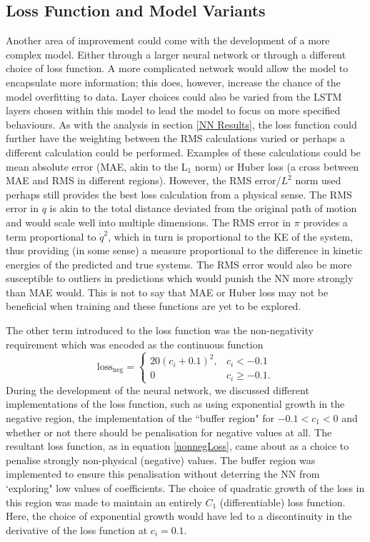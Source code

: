 \documentclass[10pt]{iopart}
\begin{document}
\subsection{Loss Function and Model Variants}
Another area of improvement could come with the development of a more complex model. Either through a larger neural network or through a different choice of loss function. A more complicated network would allow the model to encapsulate more information; this does, however, increase the chance of the model overfitting to data. Layer choices could also be varied from the LSTM layers chosen within this model to lead the model to focus on more specified behaviours. As with the analysis in section \ref{NN Results}, the loss function could further have the weighting between the RMS calculations varied or perhaps a different calculation could be performed. Examples of these calculations could be mean absolute error (MAE, akin to the L$_1$ norm) or Huber loss (a cross between MAE and RMS in different regions). However, the RMS error/$L^2$ norm used perhaps still provides the best loss calculation from a physical sense. The RMS error in $q$ is akin to the total distance deviated from the original path of motion and would scale well into multiple dimensions. The RMS error in $\pi$ provides a term proportional to $\dot q^2$, which in turn is proportional to the KE of the system, thus providing (in some sense) a measure proportional to the difference in kinetic energies of the predicted and true systems. The RMS error would also be more susceptible to outliers in predictions which would punish the NN more strongly than MAE would. This is not to say that MAE or Huber loss may not be beneficial when training and these functions are yet to be explored.

The other term introduced to the loss function was the non-negativity requirement which was encoded as the continuous function 
\begin{equation}
	\label{nonnegLoss}
	\textrm{loss}_{\textrm{neg}} = 
	\begin{cases}
		20(c_i + 0.1)^2, &c_i<-0.1\\
		0 &c_i \geq -0.1.
	\end{cases}
\end{equation}
During the development of the neural network, we discussed different implementations of the loss function, such as using exponential growth in the negative region, the implementation of the ``buffer region" for $-0.1 < c_1 < 0$ and whether or not there should be penalisation for negative values at all. The resultant loss function, as in equation \ref{nonnegLoss}, came about as a choice to penalise strongly non-physical (negative) values. The buffer region was implemented to ensure this penalisation without deterring the NN from `exploring" low values of coefficients. The choice of quadratic growth of the loss in this region was made to maintain an entirely $C_1$ (differentiable) loss function. Here, the choice of exponential growth would have led to a discontinuity in the derivative of the loss function at $c_i = 0.1$. 
\end{document}
